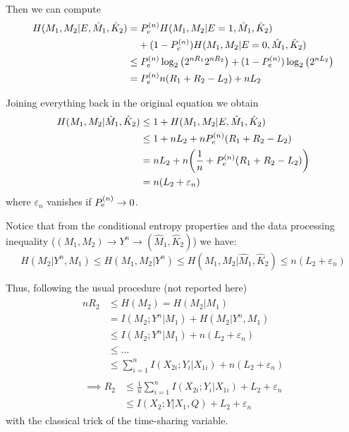 Then we can compute
%
\begin{align}
\begin{split}
H(M_1,M_2|E,\hat{M}_1,\hat{K}_2) &= \Pen H(M_1,M_2|E=1,\hat{M}_1,\hat{K}_2)\\
&\hphantom{={}} + (1-\Pen) H(M_1,M_2|E=0,\hat{M}_1,\hat{K}_2)\\
&\leq \Pen \log_2 \qty(2^{nR_1}2^{nR_2}) + (1-\Pen) \log_2 \qty(2^{nL_2})\\
&= \Pen n(R_1+R_2-L_2) + nL_2
\end{split}
\end{align}

Joining everything back in the original equation we obtain
\begin{align}
\begin{split}
H(M_1,M_2|\hat{M}_1,\hat{K}_2) &\leq 1 + H(M_1,M_2|E,\hat{M}_1,\hat{K}_2)\\
&\leq 1 + nL_2 + n P_e^{(n)}  (R_1+R_2-L_2)\\
&= nL_2 + n \qty(\frac{1}{n} +  P_e^{(n)}  (R_1+R_2-L_2))\\
&= n (L_2 + \varepsilon_n)
\end{split}
\end{align}
where $\varepsilon_n$ vanishes if $ P_e^{(n)}  \rightarrow 0$.

Notice that from the conditional entropy properties and the data processing inequality ($(M_1,M_2)\rightarrow Y^n \rightarrow (\hat{M}_1,\hat{K}_2)$) we have:
%
\begin{equation}
H(M_2|Y^n,M_1) \leq H(M_1,M_2|Y^n) \leq H(M_1,M_2|\hat{M}_1,\hat{K}_2) \leq n(L_2 + \varepsilon_n)
\end{equation}

Thus, following the usual procedure (not reported here)
%
\begin{align}
\begin{split}
nR_2 &\leq H(M_2) = H(M_2|M_1)\\
&= I(M_2;Y^n|M_1) + H(M_2|Y^n,M_1)\\
&\leq I(M_2;Y^n|M_1) + n(L_2 + \varepsilon_n)\\
&\leq \ldots\\
&\leq \sum_{i=1}^n I(X_{2i};Y_i|X_{1i}) + n(L_2 + \varepsilon_n)
\end{split}
\end{align}
\begin{eqnarray}
\begin{split}
\implies R_2 &\leq \frac{1}{n} \sum_{i=1}^n I(X_{2i};Y_i|X_{1i}) + L_2 + \varepsilon_n\\
&\leq I(X_2;Y|X_1,Q) + L_2 + \varepsilon_n
\end{split}
\end{eqnarray}
%
with the classical trick of the time-sharing variable.

